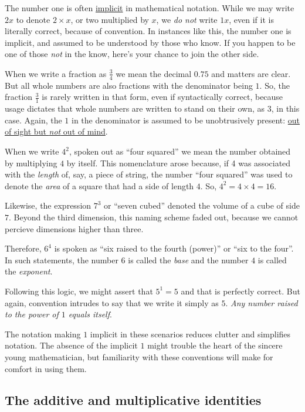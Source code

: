 \documentclass[
  a4paper,
]{article}
\begin{document}
The number one is often
\href{https://www.vocabulary.com/dictionary/implicit}{implicit} in
mathematical notation. While we may write \(2x\) to denote
\(2\times x\), or two multiplied by \(x\), we \emph{do not} write
\(1x\), even if it is literally correct, because of convention. In
instances like this, the number one is implicit, and assumed to be
understood by those who know. If you happen to be one of those
\emph{not} in the know, here's your chance to join the other side.

When we write a fraction as \(\frac{3}{4}\) we mean the decimal \(0.75\)
and matters are clear. But all whole numbers are also fractions with the
denominator being \(1\). So, the fraction \(\frac{3}{1}\) is rarely
written in that form, even if syntactically correct, because usage
dictates that whole numbers are written to stand on their own, as \(3\),
in this case. Again, the \(1\) in the denominator is assumed to be
unobtrusively present:
\href{https://dictionary.cambridge.org/dictionary/english/out-of-sight-out-of-mind}{out
of sight but \emph{not} out of mind}.

When we write \(4^2\), spoken out as ``four squared'' we mean the number
obtained by multiplying \(4\) by itself. This nomenclature arose
because, if 4 was associated with the \emph{length} of, say, a piece of
string, the number ``four squared'' was used to denote the \emph{area}
of a square that had a side of length \(4\). So,
\(4^2 = 4\times4 = 16\).

Likewise, the expression \(7^3\) or ``seven cubed'' denoted the volume
of a cube of side \(7\). Beyond the third dimension, this naming scheme
faded out, because we cannot percieve dimensions higher than three.

Therefore, \(6^4\) is spoken as ``six raised to the fourth (power)'' or
``six to the four''. In such statements, the number \(6\) is called the
\emph{base} and the number \(4\) is called the \emph{exponent}.

Following this logic, we might assert that \(5^1 = 5\) and that is
perfectly correct. But again, convention intrudes to say that we write
it simply as \(5\). \emph{Any number raised to the power of \(1\) equals
itself}.

The notation making \(1\) implicit in these scenarios reduces clutter
and simplifies notation. The absence of the implicit \(1\) might trouble
the heart of the sincere young mathematician, but familiarity with these
conventions will make for comfort in using them.

\hypertarget{the-additive-and-multiplicative-identities}{%
\subsection{The additive and multiplicative
identities}\label{the-additive-and-multiplicative-identities}}
\end{document}
